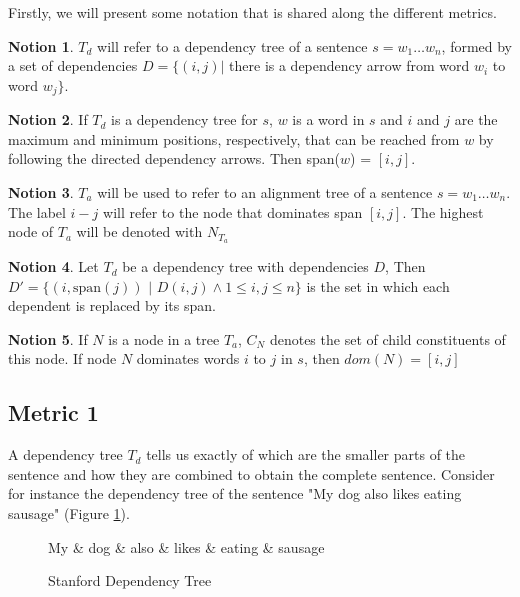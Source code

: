\documentclass{report}
\theoremstyle{definition}
\newtheorem{notion}{Notion}
\theoremstyle{plain}
\begin{document}
Firstly, we will present some notation that is shared along the different metrics.

\begin{notion}
$T_d$ will refer to a dependency tree of a sentence $s = w_1 \dots w_n$, formed by a set of dependencies $D = \{ (i,j) |$ there is a dependency arrow from word $w_i$ to word $w_j \}$.
\end{notion}

\begin{notion}
If $T_d$ is a dependency tree for $s$, $w$ is a word in $s$ and $i$ and $j$ are the maximum and minimum positions, respectively, that can be reached from $w$ by following the directed dependency arrows. Then span($w$) = $[i,j]$.
\end{notion}

\begin{notion}
$T_a$ will be used to refer to an alignment tree of a sentence $s = w_1 \dots w_n$. The label $i-j$ will refer to the node that dominates span $[i,j]$. The highest node of $T_a$ will be denoted with $N_{T_a}$
\end{notion}

\begin{notion}
Let $T_d$ be a dependency tree with dependencies $D$, Then $D' = \{ (i,\textrm{span}(j))$ $|$ $D(i,j) \land 1 \leq i,j \leq n \}$ is the set in which each dependent is replaced by its span.
\end{notion}

\begin{notion}
If $N$ is a node in a tree $T_a$, $C_N$ denotes the set of child constituents of this node. If node $N$ dominates words $i$ to $j$ in $s$, then $dom(N)= [i,j]$
\end{notion}

\subsection{Metric 1}

A dependency tree $T_d$ tells us exactly of which are the smaller parts of the sentence and how they are combined to obtain the complete sentence. Consider for instance the dependency tree of the sentence "My dog also likes eating sausage" (Figure \ref{fig:deptree1}).

\begin{figure}[!h]\label{fig:deptree1}
\centering
\begin{dependency}[theme=simple]%
\begin{deptext}[column sep=.5cm, row sep=.1ex]
My \& dog \& also \& likes \& eating \& sausage \\
\end{deptext}
\end{dependency}
\caption{Stanford Dependency Tree}
\end{figure}
\end{document}
